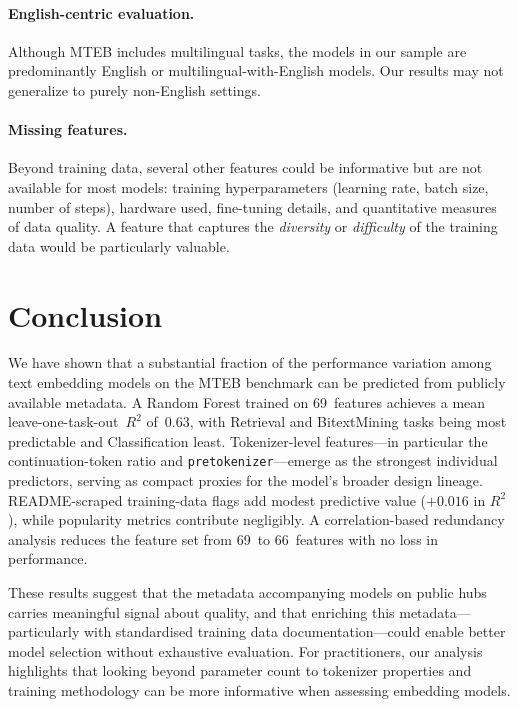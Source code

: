 \documentclass[11pt,a4paper,twocolumn]{article}
\begin{document}
\paragraph{English-centric evaluation.}
Although MTEB includes multilingual tasks, the models in our sample are predominantly English or multilingual-with-English models.
Our results may not generalize to purely non-English settings.

\paragraph{Missing features.}
Beyond training data, several other features could be informative but are not available for most models: training hyperparameters (learning rate, batch size, number of steps), hardware used, fine-tuning details, and quantitative measures of data quality.
A feature that captures the \emph{diversity} or \emph{difficulty} of the training data would be particularly valuable.


\section{Conclusion}
\label{sec:conclusion}

We have shown that a substantial fraction of the performance variation among text embedding models on the MTEB benchmark can be predicted from publicly available metadata.
A Random Forest trained on 69~features achieves a mean leave-one-task-out~$R^2$ of~0.63, with Retrieval and BitextMining tasks being most predictable and Classification least.
Tokenizer-level features---in particular the continuation-token ratio and \texttt{pretokenizer}---emerge as the strongest individual predictors, serving as compact proxies for the model's broader design lineage.
README-scraped training-data flags add modest predictive value ($+0.016$ in $R^2$), while popularity metrics contribute negligibly.
A correlation-based redundancy analysis reduces the feature set from 69~to 66~features with no loss in performance.

These results suggest that the metadata accompanying models on public hubs carries meaningful signal about quality, and that enriching this metadata---particularly with standardised training data documentation---could enable better model selection without exhaustive evaluation.
For practitioners, our analysis highlights that looking beyond parameter count to tokenizer properties and training methodology can be more informative when assessing embedding models.
\end{document}
